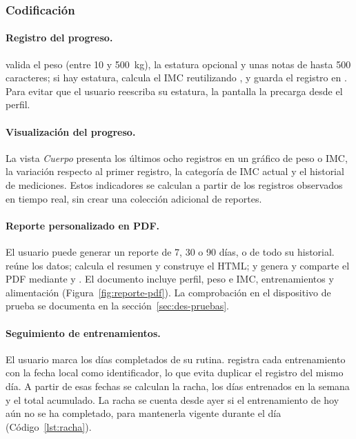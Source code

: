 \subsubsection{Codificación}

\paragraph{Registro del progreso.}  valida el
peso (entre 10 y 500~kg), la estatura opcional y unas notas de hasta 500
caracteres; si hay estatura, calcula el IMC reutilizando
, y guarda el registro en
. Para evitar que el usuario
reescriba su estatura, la pantalla la precarga desde el perfil.

\paragraph{Visualización del progreso.} La vista \emph{Cuerpo} presenta los
últimos ocho registros en un gráfico de peso o IMC, la variación respecto al
primer registro, la categoría de IMC actual y el historial de mediciones.
Estos indicadores se calculan a partir de los registros observados en tiempo
real, sin crear una colección adicional de reportes.

\paragraph{Reporte personalizado en PDF.} El usuario puede generar un reporte
de 7, 30 o 90 días, o de todo su historial. 
reúne los datos;  calcula el resumen y construye
el HTML; y  genera y comparte el PDF mediante
 y . El documento incluye perfil,
peso e IMC, entrenamientos y alimentación
(Figura~\ref{fig:reporte-pdf}). La comprobación en el dispositivo de prueba se
documenta en la sección~\ref{sec:des-pruebas}.

\paragraph{Seguimiento de entrenamientos.} El usuario marca los días
completados de su rutina.  registra cada
entrenamiento con la fecha local como identificador, lo que evita duplicar
el registro del mismo día. A partir de esas fechas se calculan la racha,
los días entrenados en la semana y el total acumulado. La racha se cuenta
desde ayer si el entrenamiento de hoy aún no se ha completado, para mantenerla
vigente durante el día (Código~\ref{lst:racha}).

